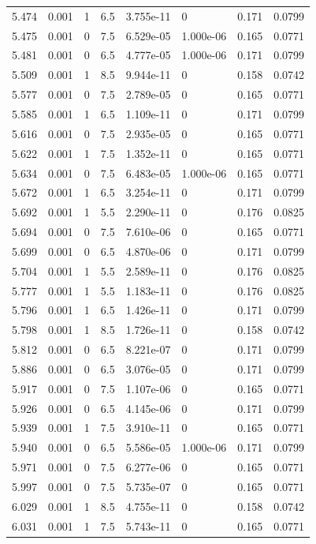 \documentclass[preview]{standalone}
\begin{document}
{{{{{{\begin{tabular}{L{1.2cm}C{1.2cm} C{0.3cm}C{0.5cm} C{1.4cm}C{1.4cm} C{1.4cm}C{1.4cm}}
  5.474  &  0.001  & 1     & 6.5 &  3.755e-11  & 0  & 0.171 &  0.0799   \\ 
  5.475  &  0.001  & 0     & 7.5 &  6.529e-05  & 1.000e-06  & 0.165 &  0.0771   \\ 
  5.481  &  0.001  & 0     & 6.5 &  4.777e-05  & 1.000e-06  & 0.171 &  0.0799   \\ 
  5.509  &  0.001  & 1     & 8.5 &  9.944e-11  & 0  & 0.158 &  0.0742   \\ 
  5.577  &  0.001  & 0     & 7.5 &  2.789e-05  & 0  & 0.165 &  0.0771   \\ 
  5.585  &  0.001  & 1     & 6.5 &  1.109e-11  & 0  & 0.171 &  0.0799   \\ 
  5.616  &  0.001  & 0     & 7.5 &  2.935e-05  & 0  & 0.165 &  0.0771   \\ 
  5.622  &  0.001  & 1     & 7.5 &  1.352e-11  & 0  & 0.165 &  0.0771   \\ 
  5.634  &  0.001  & 0     & 7.5 &  6.483e-05  & 1.000e-06  & 0.165 &  0.0771   \\ 
  5.672  &  0.001  & 1     & 6.5 &  3.254e-11  & 0  & 0.171 &  0.0799   \\ 
  5.692  &  0.001  & 1     & 5.5 &  2.290e-11  & 0  & 0.176 &  0.0825   \\ 
  5.694  &  0.001  & 0     & 7.5 &  7.610e-06  & 0  & 0.165 &  0.0771   \\ 
  5.699  &  0.001  & 0     & 6.5 &  4.870e-06  & 0  & 0.171 &  0.0799   \\ 
  5.704  &  0.001  & 1     & 5.5 &  2.589e-11  & 0  & 0.176 &  0.0825   \\ 
  5.777  &  0.001  & 1     & 5.5 &  1.183e-11  & 0  & 0.176 &  0.0825   \\ 
  5.796  &  0.001  & 1     & 6.5 &  1.426e-11  & 0  & 0.171 &  0.0799   \\ 
  5.798  &  0.001  & 1     & 8.5 &  1.726e-11  & 0  & 0.158 &  0.0742   \\ 
  5.812  &  0.001  & 0     & 6.5 &  8.221e-07  & 0  & 0.171 &  0.0799   \\ 
  5.886  &  0.001  & 0     & 6.5 &  3.076e-05  & 0  & 0.171 &  0.0799   \\ 
  5.917  &  0.001  & 0     & 7.5 &  1.107e-06  & 0  & 0.165 &  0.0771   \\ 
  5.926  &  0.001  & 0     & 6.5 &  4.145e-06  & 0  & 0.171 &  0.0799   \\ 
  5.939  &  0.001  & 1     & 7.5 &  3.910e-11  & 0  & 0.165 &  0.0771   \\ 
  5.940  &  0.001  & 0     & 6.5 &  5.586e-05  & 1.000e-06  & 0.171 &  0.0799   \\ 
  5.971  &  0.001  & 0     & 7.5 &  6.277e-06  & 0  & 0.165 &  0.0771   \\ 
  5.997  &  0.001  & 0     & 7.5 &  5.735e-07  & 0  & 0.165 &  0.0771   \\ 
  6.029  &  0.001  & 1     & 8.5 &  4.755e-11  & 0  & 0.158 &  0.0742   \\ 
  6.031  &  0.001  & 1     & 7.5 &  5.743e-11  & 0  & 0.165 &  0.0771   \\ 
\hline 
\end{tabular} 

}}}}}}
\end{document}
